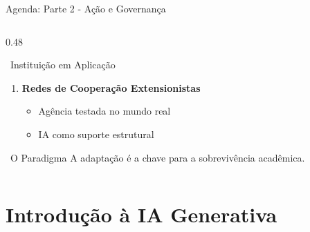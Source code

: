 \documentclass[aspectratio=169,12pt]{beamer}
\begin{document}
\begin{frame}[shrink]{Agenda: Parte 2 - Ação e Governança}
\begin{columns}[T]
\begin{column}{0.48\textwidth}
\begin{block}{\faListOl\, Instituição em Aplicação}
\begin{enumerate}
                    \item \textbf{Redes de Cooperação Extensionistas}
                    \begin{itemize}
                        \item Agência testada no mundo real
                        \item IA como suporte estrutural
                    \end{itemize}
                \end{enumerate}
            \end{block}
            \vspace{0.5cm}
            \begin{exampleblock}{\faLightbulb\, O Paradigma}
                \centering
                A adaptação é a chave para a sobrevivência acadêmica.
            \end{exampleblock}
        \end{column}
    \end{columns}
\end{frame}


\section{Introdução à IA Generativa}
\end{document}
